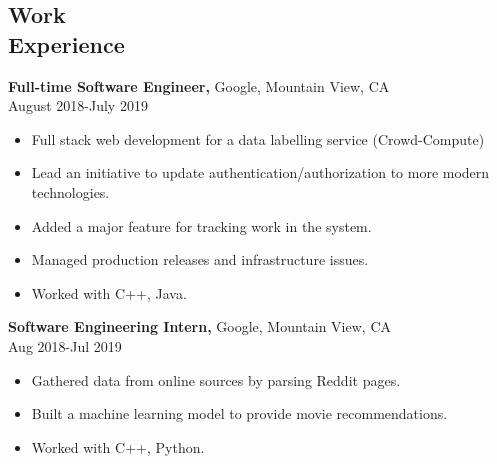 \documentclass[margin]{res}
\begin{document}
\begin{resume}
 \section{Work\\ Experience}
 {\bf Full-time Software Engineer,} Google, Mountain View, CA \\ August 2018-July 2019
 \begin{itemize} \itemsep -2pt  %
 \item Full stack web development for a data labelling service (Crowd-Compute)
 \item Lead an initiative to update authentication/authorization to more modern technologies.
 \item Added a major feature for tracking work in the system.
 \item Managed production releases and infrastructure issues.
 \item Worked with C++, Java.
 \end{itemize}
 
{\bf Software Engineering Intern,} Google, Mountain View, CA \\ Aug 2018-Jul 2019
\begin{itemize} \itemsep -2pt %
\item Gathered data from online sources by parsing Reddit pages.
\item Built a machine learning model to provide movie recommendations.
\item Worked with C++, Python.
\end{itemize}

\end{resume} 
\end{document}
